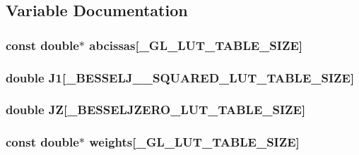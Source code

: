 \subsection{Variable Documentation}
\hypertarget{namespacegl_a8fd2242d1215dfb011d971d994f6aea5}{
\subsubsection[{abcissas}]{\setlength{\rightskip}{0pt plus 5cm}const double$\ast$ abcissas\mbox{[}\+\_\+\+G\+L\+\_\+\+L\+U\+T\+\_\+\+T\+A\+B\+L\+E\+\_\+\+S\+I\+Z\+E\mbox{]}}}\label{namespacegl_a8fd2242d1215dfb011d971d994f6aea5}
\hypertarget{namespacegl_a3f45d860f72d97fe1d1fb1e5fa4749ff}{
\subsubsection[{J1}]{\setlength{\rightskip}{0pt plus 5cm}double J1\mbox{[}\+\_\+\+B\+E\+S\+S\+E\+L\+J\+\_\+\_\+\+S\+Q\+U\+A\+R\+E\+D\+\_\+\+L\+U\+T\+\_\+\+T\+A\+B\+L\+E\+\_\+\+S\+I\+Z\+E\mbox{]}}}\label{namespacegl_a3f45d860f72d97fe1d1fb1e5fa4749ff}
\hypertarget{namespacegl_af3f8ce6ef90f2939af71d4dcd7f7300b}{
\subsubsection[{J\+Z}]{\setlength{\rightskip}{0pt plus 5cm}double J\+Z\mbox{[}\+\_\+\+B\+E\+S\+S\+E\+L\+J\+Z\+E\+R\+O\+\_\+\+L\+U\+T\+\_\+\+T\+A\+B\+L\+E\+\_\+\+S\+I\+Z\+E\mbox{]}}}\label{namespacegl_af3f8ce6ef90f2939af71d4dcd7f7300b}
\hypertarget{namespacegl_af4c9c0a0468b7e8a4a075d536afd6f65}{
\subsubsection[{weights}]{\setlength{\rightskip}{0pt plus 5cm}const double$\ast$ weights\mbox{[}\+\_\+\+G\+L\+\_\+\+L\+U\+T\+\_\+\+T\+A\+B\+L\+E\+\_\+\+S\+I\+Z\+E\mbox{]}}}\label{namespacegl_af4c9c0a0468b7e8a4a075d536afd6f65}
